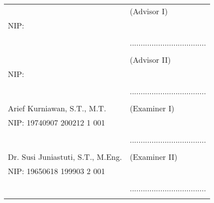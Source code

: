 \noindent
\begin{tabularx}{\textwidth}{X l}
  \advisor{}                        & (Advisor I)                         \\
  NIP: \advisornip{}                &                                     \\
                                    &                                     \\
                                    & ................................... \\
                                    &                                     \\
  \coadvisor{}                      & (Advisor II)                        \\
  NIP: \coadvisornip{}              &                                     \\
                                    &                                     \\
                                    & ................................... \\
                                    &                                     \\
  Arief Kurniawan, S.T., M.T.       & (Examiner I)                        \\
  NIP: 19740907 200212 1 001        &                                     \\
                                    &                                     \\
                                    & ................................... \\
                                    &                                     \\
  Dr. Susi Juniastuti, S.T., M.Eng. & (Examiner II)                       \\
  NIP: 19650618 199903 2 001        &                                     \\
                                    &                                     \\
                                    & ................................... \\
                                    &                                     \\
\end{tabularx}
\endgroup

